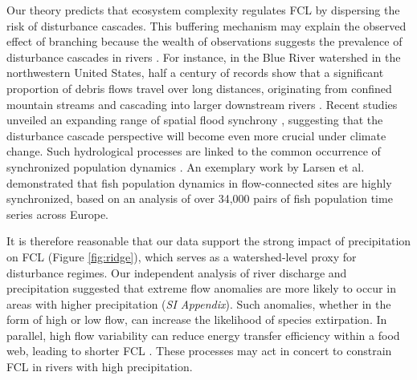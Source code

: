 \documentclass[11pt, class=article, crop=false]{standalone}
\begin{document}
Our theory predicts that ecosystem complexity regulates FCL by dispersing the risk of disturbance cascades.
This buffering mechanism may explain the observed effect of branching because the wealth of observations suggests the prevalence of disturbance cascades in rivers \citep{swanson_flood_1998, nakamura_disturbance_2000, berghuijs_growing_2019, sarremejane_drought_2021, sharma_spatial_2024}.
For instance, in the Blue River watershed in the northwestern United States, half a century of records show that a significant proportion of debris flows travel over long distances, originating from confined mountain streams and cascading into larger downstream rivers \citep{nakamura_disturbance_2000}.
Recent studies unveiled an expanding range of spatial flood synchrony \citep{berghuijs_growing_2019, sharma_spatial_2024}, suggesting that the disturbance cascade perspective will become even more crucial under climate change.
Such hydrological processes are linked to the common occurrence of synchronized population dynamics \citep{sarremejane_drought_2021, larsen_geography_2021}.
An exemplary work by Larsen et al. \citep{larsen_geography_2021} demonstrated that fish population dynamics in flow-connected sites are highly synchronized, based on an analysis of over 34,000 pairs of fish population time series across Europe.

It is therefore reasonable that our data support the strong impact of precipitation on FCL (Figure \ref{fig:ridge}), which serves as a watershed-level proxy for disturbance regimes.
Our independent analysis of river discharge and precipitation suggested that extreme flow anomalies are more likely to occur in areas with higher precipitation (\textit{SI Appendix}).
Such anomalies, whether in the form of high or low flow, can increase the likelihood of species extirpation.
In parallel, high flow variability can reduce energy transfer efficiency within a food web, leading to shorter FCL \citep{baruch_food_2023}.
These processes may act in concert to constrain FCL in rivers with high precipitation.
\end{document}
